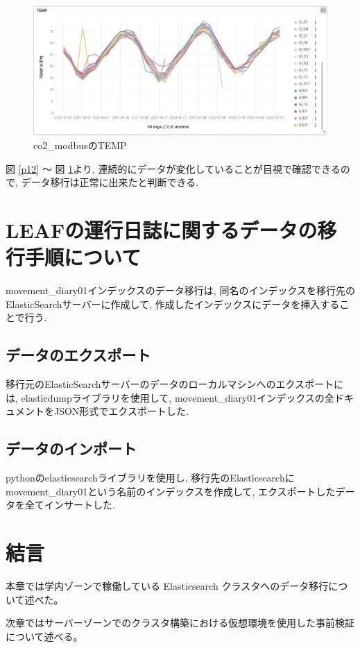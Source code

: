\begin{figure}[h]
  \begin{center}
    \includegraphics[width=160mm]{sotu/figure/temp.png}
    \caption{co2\_modbusのTEMP}
    \label{p14}
  \end{center}
\end{figure}

図 \ref{p12} 〜 図 \ref{p14}より, 連続的にデータが変化していることが目視で確認できるので, データ移行は正常に出来たと判断できる.


\section{LEAFの運行日誌に関するデータの移行手順について}

movement\_diary01インデックスのデータ移行は, 同名のインデックスを移行先のElasticSearchサーバーに作成して, 作成したインデックスにデータを挿入することで行う.

\subsection{データのエクスポート}
移行元のElasticSearchサーバーのデータのローカルマシンへのエクスポートには, elasticdumpライブラリを使用して, movement\_diary01インデックスの全ドキュメントをJSON形式でエクスポートした.

\subsection{データのインポート}
pythonのelasticsearchライブラリを使用し, 移行先のElasticsearchにmovement\_diary01という名前のインデックスを作成して, エクスポートしたデータを全てインサートした.

\section{結言}
本章では学内ゾーンで稼働している Elasticsearch クラスタへのデータ移行について述べた。

次章ではサーバーゾーンでのクラスタ構築における仮想環境を使用した事前検証について述べる。